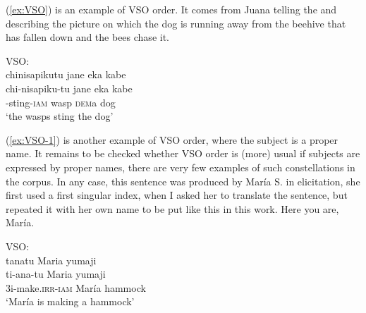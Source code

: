 %


(\ref{ex:VSO}) is an example of VSO order. It comes from Juana telling the  and describing the picture on which the dog is running away from the beehive that has fallen down and the bees chase it.

\ea\label{ex:VSO}
\begingl 
\glpreamble  \textup{VSO:}\\chinisapikutu jane eka kabe\\
\gla chi-nisapiku-tu jane eka kabe\\ 
-sting-\textsc{iam} wasp \textsc{dem}a dog\\ 
\glft ‘the wasps sting the dog’
\trailingcitation{[jxx-a120516l-a.112]}
\xe


(\ref{ex:VSO-1}) is another example of VSO order, where the subject is a proper name. It remains to be checked whether VSO order is (more) usual if subjects are expressed by proper names, there are very few examples of such constellations in the corpus. In any case, this sentence was produced by María S. in elicitation, she first used a first singular index, when I asked her to translate the sentence, but repeated it with her own name to be put like this in this work. Here you are, María.

\ea\label{ex:VSO-1}
\begingl
\glpreamble  \textup{VSO:}\\tanatu Maria yumaji\\
\gla ti-ana-tu Maria yumaji\\
\glb 3i-make.\textsc{irr}-\textsc{iam} María hammock\\
\glft ‘María is making a hammock’
\endgl
\trailingcitation{[rxx-e181022le]}
\xe


